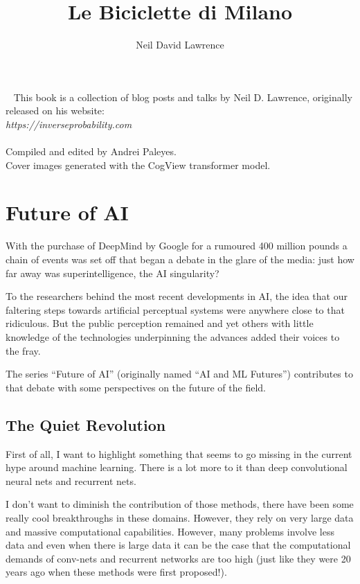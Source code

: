 \documentclass[a4paper]{caesar_book}
\title{Le Biciclette di Milano}
\author{Neil David Lawrence}
\let\oldchapter\chapter
\def\chapter{%
  \setcounter{footnote}{0}%
  \oldchapter
}
\begin{document}
\maketitlepage

\tableofcontents

~\vfill
\noindent This book is a collection of blog posts and talks by Neil D. Lawrence, originally released on his website:\\ \textit{ https://inverseprobability.com}
\\
\\
\noindent Compiled and edited by Andrei Paleyes. \\
\noindent Cover images generated with the CogView transformer model.


\part{Future of AI}

With the purchase of DeepMind by Google for a rumoured 400 million pounds a chain of events was set off that began a debate in the glare of the media: just how far away was superintelligence, the AI singularity?

To the researchers behind the most recent developments in AI, the idea that our faltering steps towards artificial perceptual systems were anywhere close to that ridiculous. But the public perception remained and yet others with little knowledge of the technologies underpinning the advances added their voices to the fray.

The series ``Future of AI'' (originally named ``AI and ML Futures'') contributes to that debate with some perspectives on the future of the field.

\chapter{The Quiet Revolution}

First of all, I want to highlight something that seems to go missing in the current hype around machine learning. There is a lot more to it than deep convolutional neural nets and recurrent nets.

I don’t want to diminish the contribution of those methods, there have been some really cool breakthroughs in these domains. However, they rely on very large data and massive computational capabilities. However, many problems involve less data and even when there is large data it can be the case that the computational demands of conv-nets and recurrent networks are too high (just like they were 20 years ago when these methods were first proposed!).
\end{document}
